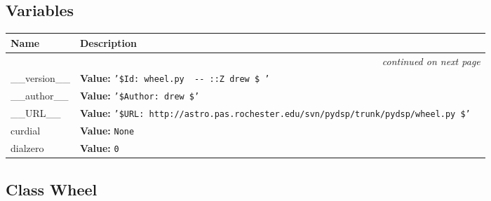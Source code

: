 
  \subsection{Variables}

\begin{longtable}{|p{}|p{}|l}
\cline{1-2}
\cline{1-2} \centering \textbf{Name} & \centering \textbf{Description}& \\
\cline{1-2}
\endhead\cline{1-2}\multicolumn{3}{r}{\small\textit{continued on next page}}\\\endfoot\cline{1-2}
\endlastfoot\raggedright \_\-\_\-v\-e\-r\-s\-i\-o\-n\-\_\-\_\- & \textbf{Value:} 
{\tt '\-\$\-I\-d\-:\-~\-w\-h\-e\-e\-l\-.\-p\-y\-~\-3\-9\-9\-~\-2\-0\-0\-6\--\-0\-6\--\-0\-4\-~\-2\-0\-:\-0\-2\-:\-1\-7\-Z\-~\-d\-r\-e\-w\-~\-\$\-~\-'\-}&\\
\cline{1-2}
\raggedright \_\-\_\-a\-u\-t\-h\-o\-r\-\_\-\_\- & \textbf{Value:} 
{\tt '\-\$\-A\-u\-t\-h\-o\-r\-:\-~\-d\-r\-e\-w\-~\-\$\-'\-}&\\
\cline{1-2}
\raggedright \_\-\_\-U\-R\-L\-\_\-\_\- & \textbf{Value:} 
{\tt '\-\$\-U\-R\-L\-:\-~\-h\-t\-t\-p\-:\-/\-/\-a\-s\-t\-r\-o\-.\-p\-a\-s\-.\-r\-o\-c\-h\-e\-s\-t\-e\-r\-.\-e\-d\-u\-/\-s\-v\-n\-/\-p\-y\-d\-s\-p\-/\-t\-r\-u\-n\-k\-/\-p\-y\-d\-s\-p\-/\-w\-h\-e\-e\-l\-.\-p\-y\-~\-\$\-'\-}&\\
\cline{1-2}
\raggedright c\-u\-r\-d\-i\-a\-l\- & \textbf{Value:} 
{\tt N\-o\-n\-e\-}&\\
\cline{1-2}
\raggedright d\-i\-a\-l\-z\-e\-r\-o\- & \textbf{Value:} 
{\tt 0\-}&\\
\cline{1-2}
\end{longtable}



\subsection{Class Wheel}

    \label{wheel:Wheel}

